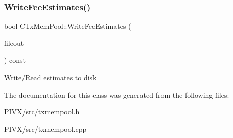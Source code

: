 \subsubsection{\texorpdfstring{Write\+Fee\+Estimates()}{WriteFeeEstimates()}}
{\footnotesize\ttfamily bool C\+Tx\+Mem\+Pool\+::\+Write\+Fee\+Estimates (\begin{DoxyParamCaption}\item[{\mbox{\hyperlink{class_c_auto_file}{C\+Auto\+File}} \&}]{fileout }\end{DoxyParamCaption}) const}

Write/\+Read estimates to disk 

The documentation for this class was generated from the following files\+:\begin{DoxyCompactItemize}
\item 
P\+I\+V\+X/src/txmempool.\+h\item 
P\+I\+V\+X/src/txmempool.\+cpp\end{DoxyCompactItemize}
